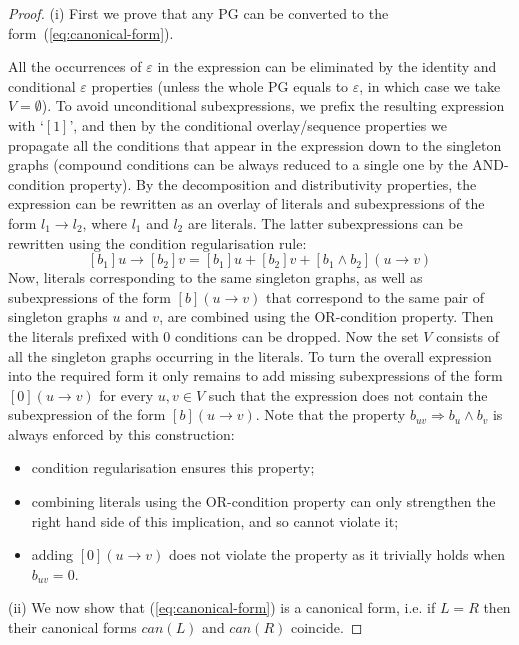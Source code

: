 \begin{proof}
(i) First we prove that any PG can be converted to the form~(\ref{eq:canonical-form}).

All the occurrences of $\varepsilon$ in the expression can be eliminated
by the identity and conditional $\varepsilon$ properties (unless
the whole PG equals to $\varepsilon$, in which case we take $V=\emptyset$).
To avoid unconditional subexpressions, we prefix the resulting expression
with `$[1]$', and then by the conditional overlay/sequence properties
we propagate all the conditions that appear in the expression down
to the singleton graphs (compound conditions can be always reduced
to a single one by the AND-condition property). By the decomposition
and distributivity properties, the expression can be rewritten as
an overlay of literals and subexpressions of the form $l_{1}\rightarrow l_{2}$,
where $l_{1}$ and $l_{2}$ are literals. The latter subexpressions
can be rewritten using the condition regularisation rule:
\[
[b_{1}]u\rightarrow[b_{2}]v=[b_{1}]u+[b_{2}]v+[b_{1}\wedge b_{2}](u\rightarrow v)
\]
Now, literals corresponding to the same singleton graphs, as well
as subexpressions of the form $[b](u\rightarrow v)$ that correspond
to the same pair of singleton graphs $u$ and $v$, are combined using
the OR-condition property. Then the literals prefixed with 0 conditions
can be dropped. Now the set $V$ consists of all the singleton graphs
occurring in the literals. To turn the overall expression into the
required form it only remains to add missing subexpressions of the
form $[0](u\rightarrow v)$ for every $u,v\in V$ such that the expression
does not contain the subexpression of the form $[b](u\rightarrow v)$.
Note that the property $b_{uv}\Rightarrow b_{u}\wedge b_{v}$ is always
enforced by this construction:
\begin{itemize}
\item condition regularisation ensures this property;
\item combining literals using the OR-condition property can only strengthen
the right hand side of this implication, and so cannot violate it;
\item adding $[0](u\rightarrow v)$ does not violate the property as it
trivially holds when $b_{uv}=0$.
\end{itemize}
(ii) We now show that (\ref{eq:canonical-form}) is a canonical form,
i.e. if $L=R$ then their canonical forms $\mathit{can}(L)$ and $\mathit{can}(R)$
coincide.


\end{proof}

